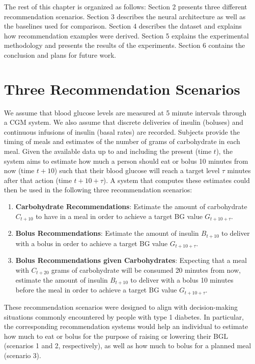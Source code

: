 \documentclass[graybox]{svmult}
\begin{document}
The rest of this chapter is organized as follows: Section 2 presents three different recommendation scenarios. Section 3 describes the neural architecture as well as the baselines used for comparison. Section 4 describes the dataset and explains how recommendation examples were derived. Section 5 explains the experimental methodology and presents the results of the experiments. Section 6 contains the conclusion and plans for future work.



\section{Three Recommendation Scenarios}

We assume that blood glucose levels are measured at 5 minute intervals through a CGM system. We also assume that discrete deliveries of insulin (boluses) and continuous infusions of insulin (basal rates) are recorded. Subjects provide the timing of meals and estimates of the number of grams of carbohydrate in each meal. Given the available data up to and including the present (time $t$), the system aims to estimate how much a person should eat or bolus 10 minutes from now (time $t+10$) such that their blood glucose will reach a target level $\tau$ minutes after that action (time $t + 10 + \tau$). A system that computes these estimates could then be used in the following three recommendation scenarios:
\begin{enumerate}
    \item {\bf Carbohydrate Recommendations}: Estimate the amount of carbohydrate $C_{t+10}$ to have in a meal in order to achieve a target BG value $G_{t+10+\tau}$.
    \item {\bf Bolus Recommendations}: Estimate the amount of insulin $B_{t+10}$ to deliver with a bolus in order to achieve a target BG value $G_{t+10+\tau}$.
    \item {\bf Bolus Recommendations given Carbohydrates}: Expecting that a meal with $C_{t+20}$ grams of carbohydrate will be consumed 20 minutes from now, estimate the amount of insulin $B_{t+10}$ to deliver with a bolus 10 minutes before the meal in order to achieve a target BG value $G_{t+10+\tau}$.
\end{enumerate}
These recommendation scenarios were designed to align with decision-making situations commonly encountered by people with type 1 diabetes. In particular, the corresponding recommendation systems would help an individual to estimate how much to eat or bolus for the purpose of raising or lowering their BGL (scenarios 1 and 2, respectively), as well as how much to bolus for a planned meal (scenario 3).
\end{document}
